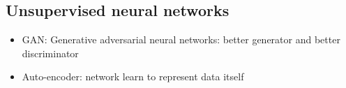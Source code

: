 \documentclass[twoside,12pt]{article}
\begin{document}
\subsection{Unsupervised neural networks}
\begin{itemize}
\item GAN: Generative adversarial neural networks: better generator and better discriminator 
\item Auto-encoder: network learn to represent data itself
\end{itemize}

\end{document}

